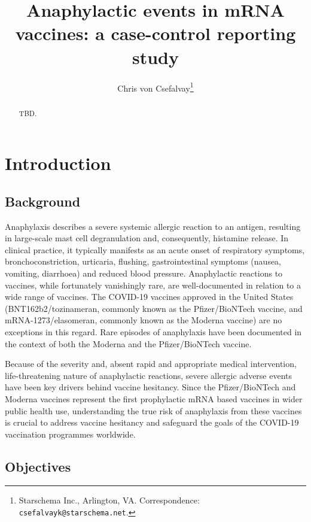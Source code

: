 \documentclass{article}
\title{Anaphylactic events in mRNA vaccines: a case-control reporting study}
\author{Chris von Csefalvay\thanks{Starschema Inc., Arlington, VA. Correspondence: \texttt{csefalvayk@starschema.net}.}}
\begin{document}
\maketitle

\onehalfspacing

\begin{abstract}
    TBD.
\end{abstract}

\section{Introduction}

\subsection{Background}

Anaphylaxis describes a severe systemic allergic reaction to an antigen, resulting in large-scale mast cell degranulation and, consequently, histamine release.\cite{metcalfe2009mechanisms}
In clinical practice, it typically manifests as an acute onset of respiratory symptoms, bronchoconstriction, urticaria, flushing, gastrointestinal symptoms (nausea, vomiting, diarrhoea) and reduced blood pressure.\cite{lee2011anaphylaxis}
Anaphylactic reactions to vaccines, while fortunately vanishingly rare, are well-documented in relation to a wide range of vaccines.\cite{su2019anaphylaxis,kelso1999anaphylaxis,kelso1993anaphylaxis,nagao2016highly}
The COVID-19 vaccines approved in the United States (BNT162b2/tozinameran, commonly known as the Pfizer/BioNTech vaccine, and mRNA-1273/elasomeran, commonly known as the Moderna vaccine) are no exceptions in this regard.
Rare episodes of anaphylaxis have been documented in the context of both the Moderna\cite{covid2021allergicmoderna} and the Pfizer/BioNTech vaccine.\cite{shimabukuro2021allergic}

Because of the severity and, absent rapid and appropriate medical intervention, life-threatening nature of anaphylactic reactions, severe allergic adverse events have been key drivers behind vaccine hesitancy.\cite{tulloch2021covid,marcec2021postvaccination,jacobson2015vaccine}
Since the Pfizer/BioNTech and Moderna vaccines represent the first prophylactic mRNA based vaccines in wider public health use, understanding the true risk of anaphylaxis from these vaccines is crucial to address vaccine hesitancy and safeguard the goals of the COVID-19 vaccination programmes worldwide.

\subsection{Objectives}\label{subsec:objectives}
\end{document}

